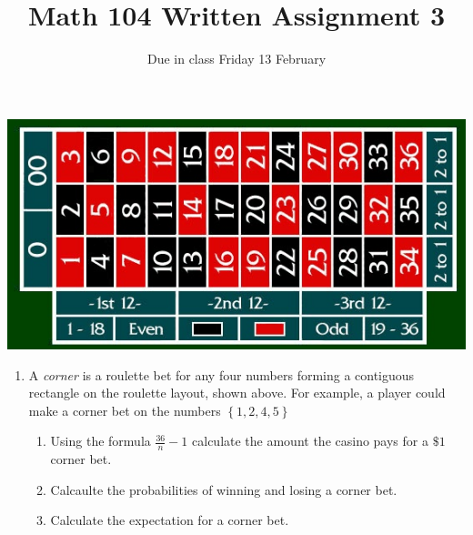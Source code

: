 \documentclass[12pt]{article}
\author{}\date{Due in class Friday 13 February}
\title{Math 104 Written Assignment 3}\author{}
\begin{document}
\maketitle
\pagestyle{empty}

\includegraphics[scale=.5]{RouletteLayout}
\begin{enumerate}
\item A {\em corner} is a roulette bet for any four numbers forming
a contiguous rectangle on the roulette layout, shown above.
For example, a player could make a corner bet on the numbers
$\left\{1,2,4,5\right\}$
\begin{enumerate}
\item Using the formula $\frac{36}{n}-1$ calculate the amount
the casino pays for a $\$1$ corner bet.
\item Calcaulte the probabilities of winning and losing a corner bet.
\item Calculate the expectation for a corner bet.
\end{enumerate}
\end{enumerate}
\end{document}
